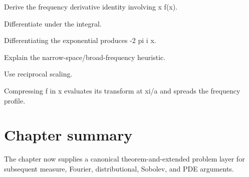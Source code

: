 \begin{exercise}\label{exr:iii11-expand-15}
Derive the frequency derivative identity involving x f(x).
\end{exercise}
\begin{hint}
Differentiate under the integral.
\end{hint}
\begin{solution}
Differentiating the exponential produces -2 pi i x.
\end{solution}

\begin{exercise}\label{exr:iii11-expand-16}
Explain the narrow-space/broad-frequency heuristic.
\end{exercise}
\begin{hint}
Use reciprocal scaling.
\end{hint}
\begin{solution}
Compressing f in x evaluates its transform at xi/a and spreads the frequency profile.
\end{solution}
\section*{Chapter summary}
The chapter now supplies a canonical theorem-and-extended problem layer for subsequent measure, Fourier, distributional, Sobolev, and PDE arguments.
